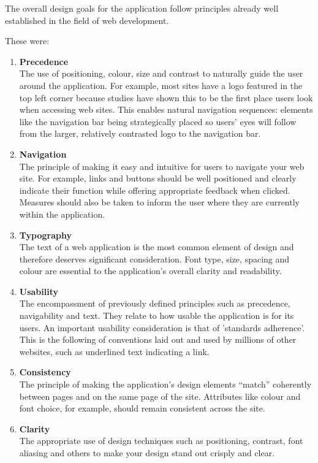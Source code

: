 \documentclass{l3proj}
\begin{document}
The overall design goals for the application follow principles already well established in the field of web development.

These were:

\begin{enumerate} 
\item{\textbf{Precedence}} \\
The use of positioning, colour, size and contrast to naturally guide the user around the application. For example, most sites have a logo featured in the top left corner because studies have shown this to be the first place users look when accessing web sites. This enables natural navigation sequences: elements like the navigation bar being strategically placed so users' eyes will follow from the larger, relatively contrasted logo to the navigation bar.

\item{\textbf{Navigation}} \\
The principle of making it easy and intuitive for users to navigate your web site. For example, links and buttons should be well positioned and clearly indicate their function while offering appropriate feedback when clicked. Measures should also be taken to inform the user where they are currently within the application.

\item{\textbf{Typography}} \\
The text of a web application is the most common element of design and therefore deserves significant consideration. Font type, size, spacing and colour are essential to the application's overall clarity and readability.

\item{\textbf{Usability}} \\
The encompassment of previously defined principles such as precedence, navigability and text. They relate to how usable the application is for its users. An important usability consideration is that of 'standards adherence'. This is the following of conventions laid out and used by millions of other websites, such as underlined text indicating a link.

\item{\textbf{Consistency}} \\
The principle of making the application's design elements ``match'' coherently between pages and on the same page of the site. Attributes like colour and font choice, for example, should remain consistent across the site.

\item{\textbf{Clarity}} \\
The appropriate use of design techniques such as positioning, contrast, font aliasing and others to make your design stand out crisply and clear. 
\end{enumerate}
	
\end{document}

